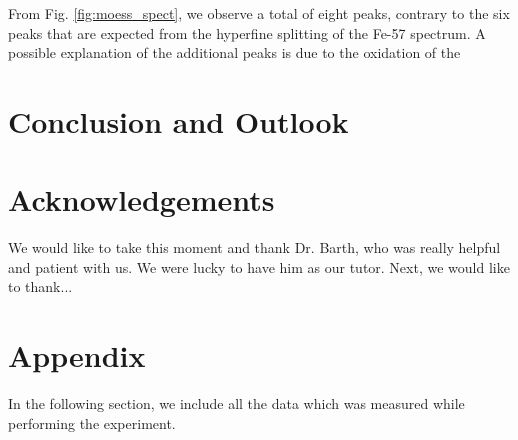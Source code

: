 \documentclass[a4paper]{report}
\numberwithin{equation}{section}
\begin{document}
From Fig. \ref{fig:moess_spect}, we observe a total of eight peaks, contrary to the 
six peaks that are expected from the hyperfine splitting of the Fe-57 spectrum.
A possible explanation of the additional peaks is due to the oxidation of the 



\chapter{Conclusion and Outlook}

\chapter{Acknowledgements}
We would like to take this moment and thank Dr. Barth, who was really helpful and patient with us. We were lucky to have him as our tutor. Next, we would like to thank...


\printbibliography

\chapter{Appendix} \label{sec:Appendix}

In the following section, we include all the data which was measured while performing the experiment.
\end{document}
